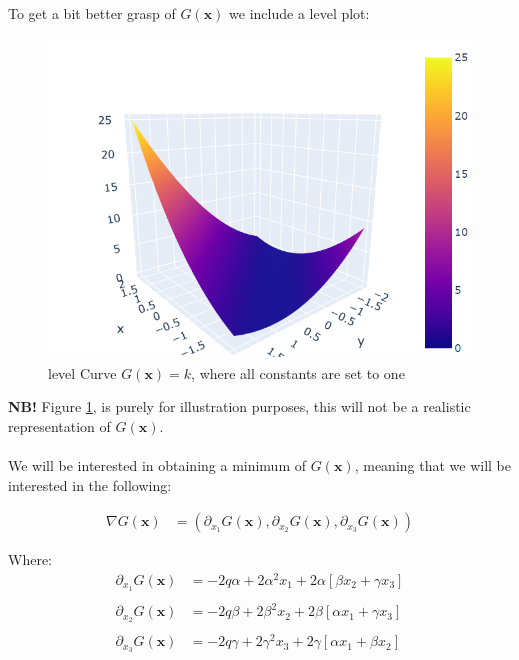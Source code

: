 \newpage 
To get a bit better grasp of $G(\mathbf{x})$ we include a level plot:

\begin{figure}[htp]
    \centering
    \includegraphics[width=12cm]{figures/SOFR/plot_G(x)_special_case.PNG}
    \caption{level Curve $G(\mathbf{x}) = k$, where all constants are set to one}
    \label{fig: plot_G(x)_SOFR_1M}
\end{figure}

\textbf{NB!} Figure \ref{fig: plot_G(x)_SOFR_1M}, is purely for illustration purposes, this will not be a realistic representation of $G(\mathbf{x})$. 
\\~\\
We will be interested in obtaining a minimum of $G(\mathbf{x})$, meaning that we will be interested in the following:  

\begin{align*}
\nabla G(\mathbf{x}) &= 
\left(
\partial_{x_{1}}G(\mathbf{x}), 
\partial_{x_{2}}G(\mathbf{x}), 
\partial_{x_{3}}G(\mathbf{x})
\right) 
\end{align*}

Where: 
\begin{align*}
\partial_{x_{1}}G(\mathbf{x}) &= 
-2q\alpha 
+ 2 \alpha^{2}x_{1}  
+ 2\alpha\left[
\beta x_{2}+ \gamma x_{3}
\right] \\ 
\\
\partial_{x_{2}}G(\mathbf{x}) &=
-2q\beta
+ 2\beta^{2} x_{2}
+ 2\beta\left[
\alpha x_{1} + \gamma x_{3}
\right] \\ 
\\ 
\partial_{x_{3}}G(\mathbf{x}) &=
-2q\gamma
+ 2\gamma^{2}x_{3}
+ 2\gamma\left[
\alpha x_{1} + \beta x_{2}
\right]
\end{align*}

